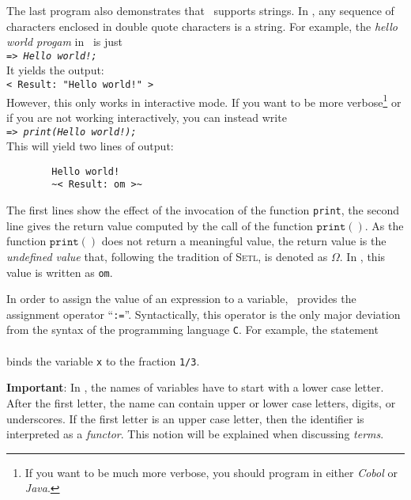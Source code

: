 \noindent
The last program also demonstrates that \setlx\ supports strings.  In \setlx, any sequence of
characters enclosed in double quote characters is a string.  For example, the 
\emph{hello world progam} in \setlx\ is just 
\\[0.2cm]
\hspace*{1.3cm}
\texttt{=> \textsl{Hello world!;}}
\\[0.2cm]
It yields the output:
\\[0.2cm]
\hspace*{1.3cm}
\texttt{< Result: "Hello world!" >}
\texttt{}
\\[0.2cm]
However, this only works in interactive mode.  If you want to be more verbose\footnote{
If you want to be much more verbose, you should program in either \textsl{Cobol} or \textsl{Java}.
} or if you are not working interactively, you can instead write
\\[0.2cm]
\hspace*{1.3cm}
\texttt{=> \textsl{print(Hello world!);}}
\\[0.2cm]
This will yield two lines of  output:
\begin{verbatim}
        Hello world!
        ~< Result: om >~
\end{verbatim}
The first lines show the effect of the invocation of the function \texttt{print}, the
second line gives the return value computed by the call of the function $\texttt{print}()$.  As the
function $\texttt{print}()$ does not return a meaningful value, the
return value is the \emph{undefined value} that, following the
tradition of \textsc{Setl}, is denoted as $\Omega$.  In \setlx, this value is written as \texttt{om}.


In order to assign the value of an expression to a variable, \setlx\ provides the assignment
operator ``\texttt{:=}''.  Syntactically, this operator is the only major deviation from the syntax
of the programming language \texttt{C}.
For example, the statement
\\[0.2cm]
\hspace*{1.3cm}
\\[0.2cm]
binds the variable \texttt{x} to the fraction \texttt{1/3}.  
\vspace*{0.3cm}

\noindent
\textbf{Important}:  In \setlx, the names of variables
have to start with a lower case letter.  After the first letter, the name can contain
upper or lower case letters, digits, or underscores.  If the first letter is an upper case
letter, then the identifier is interpreted as a \emph{functor}.  This notion will be
explained when discussing \emph{terms}.


